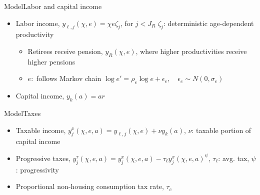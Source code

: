 \documentclass[11pt,aspectratio=169]{beamer}
\begin{document}
\begin{frame}{Model}{Labor and capital income}

\begin{itemize}
    \item Labor income, $y_{\ell,j}(\chi,e)=\chi e \zeta_{j}$, for $j<J_{R}$ $\zeta_{j}$: deterministic age-dependent productivity
    \begin{itemize}
        \item Retirees receive pension, $y_{R}(\chi,e)$, where higher productivities receive higher pensions
        \item $e:$ follows Markov chain $\log e' = \rho_{e} \log e + \epsilon_{e},\quad \epsilon_{e}\sim N(0,\sigma_{e})$
    \end{itemize}
    \item Capital income, $y_{k}(a)=ar$
\end{itemize}
\end{frame}


\begin{frame}{Model}{Taxes}

\begin{itemize}
    \item Taxable income, $y^{x}_{j}(\chi,e,a)=y_{\ell,j}(\chi,e)+\nu y_{k}(a)$, $\nu$: taxable portion of capital income
    \item Progressive taxes, $y^{\tau}_{j}(\chi,e,a) = y^{x}_{j}(\chi,e,a)-\tau_{\ell}y^{x}_{j}(\chi,e,a)^{\psi}$, $\tau_{\ell}$: avg. tax, $\psi$: progressivity
    \item Proportional non-housing consumption tax rate, $\tau_{c}$
\end{itemize}

\end{frame}

\end{document}
